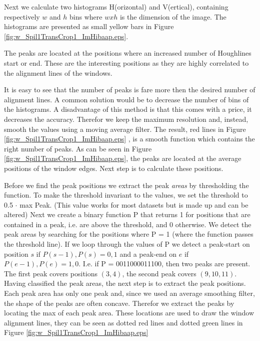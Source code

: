 Next we calculate two histograms H(orizontal) and V(ertical), containing respectively
$w$ and $h$ bins where $w x h$ is the dimension of the image.  The histograms
are presented as small yellow bars in Figure \ref{fig:w_Spil1TransCrop1_ImHibaap.eps}.

The peaks are located at the positions where an increased number of Houghlines
start or end.  These are the interesting positions as they are highly correlated
to the alignment lines of the windows. 

It is easy to see that the number of peaks is fare more then the desired number of alignment lines.
A common solution would be to decrease the number of bins of the histograms. A
disadvantage of this method is that this comes with a price, it decreases the accuracy. Therefor
we keep the maximum resolution and, instead, smooth the values using a moving average filter.
The result, red lines in Figure \ref{fig:w_Spil1TransCrop1_ImHibaap.eps}
, is a smooth function which contains the right number of peaks. As can be seen
in Figure \ref{fig:w_Spil1TransCrop1_ImHibaap.eps}, the peaks
are located at the average positions of the window edges. Next step is to
calculate these positions. 

Before we find the peak positions we extract the peak \emph{areas} by thresholding the
function. To make the threshold invariant to the values, we set the threshold to 0.5 $\cdot$ max Peak. 
(This value works for most datasets but is made up and can be altered)
Next we create a binary function P that returns 1 for positions that are contained in
a peak, i.e. are above the threshold, and 0 otherwise.
We detect the peak areas by searching for the positions where P = 1
(where the function passes the threshold line). 
If we loop through the values of P we detect a peak-start on position $s$ if ${P(s-1),P(s)}={0,1}$
and a peak-end on $e$ if ${P(e-1),P(e)}={1,0}$. 
I.e. if P = 0011000011100, then two peaks are present. The first peak covers positions $(3,4)$, 
the second peak covers $(9,10,11)$.\\

Having classified the peak areas, the next step is to extract the peak positions. 
Each peak area has only one peak and, since we used an average smoothing filter, the shape of 
the peaks are often concave. Therefor we extract the peaks by locating the max of each peak area. 
These locations are used to draw the window alignment lines, they can be seen
as dotted red lines and dotted green lines in Figure \ref{fig:w_Spil1TransCrop1_ImHibaap.eps}


